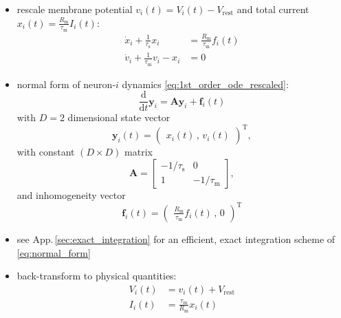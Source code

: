 \documentclass[10pt,a4paper,twoside,american]{article}
\theoremstyle{definitionstyle}
\newcommand{\diff}{\ensuremath{\text{d}}}
\newcommand{\RM}{R_\text{m}}
\newcommand{\tauM}{\tau_\text{m}}
\newcommand{\tauS}{\tau_\text{s}}
\begin{document}
\begin{appendices}
\begin{itemize}
\item rescale membrane potential $v_i(t) = V_i(t)-V_\text{rest}$ and total
  current $\displaystyle{}x_{i}(t) = \frac{\RM}{\tauM}I_{i}(t)$:
  \begin{equation}
    \label{eq:1st_order_ode_rescaled}
    \begin{aligned}
      \dot{x}_{i} + \frac{1}{\tauS} x_{i} &= \frac{\RM}{\tauM} f_{i}(t)\\
      \dot{v}_{i} + \frac{1}{\tauM} v_{i} -  x_{i}  &= 0
    \end{aligned}
  \end{equation} 
\item normal form of neuron-$i$ dynamics \eqref{eq:1st_order_ode_rescaled}:
  \begin{equation}
    \label{eq:normal_form}
    \frac{\diff}{\diff t} \bm{y}_i = \bm{A} \bm{y}_i + \bm{f}_i(t)
  \end{equation}
  with $D=2$ dimensional state vector
  \begin{equation}
    \label{eq:normal_form_state_vector}    
    \bm{y}_i(t) = 
    \begin{pmatrix}
      x_{i}(t)   \,,\,
      v_{i}(t)       
    \end{pmatrix}^\text{T},
  \end{equation}
  with constant $(D\times{}D)$ matrix
  \begin{equation}
    \label{eq:normal_form_coupling_matrix}    
    \bm{A} = 
    \begin{bmatrix}
      -1/\tauS & 0\\
      1        & -1/\tauM  
    \end{bmatrix},	   
  \end{equation}
  and inhomogeneity vector
  \begin{equation}
    \label{eq:normal_form_inhomogeneity}        
    \bm{f}_i(t) = 
    \begin{pmatrix}\displaystyle
      \frac{\RM}{\tauM} f_{i}(t)     \,,\,
      0               
    \end{pmatrix}^\text{T}
  \end{equation}
  \citep[see Sec.\,3.2.2 in][]{Rotter99_381}
\item see App.\,\ref{sec:exact_integration} for an efficient, exact integration scheme of \eqref{eq:normal_form}
\item back-transform to physical quantities:
  \begin{equation}
    \begin{aligned}
      V_i(t)      & = v_i(t)+V_\text{rest}\\
      I_{i}(t) & = \frac{\tauM}{\RM}x_{i}(t)
    \end{aligned}
  \end{equation}
\end{itemize}

\end{appendices}
\end{document}
